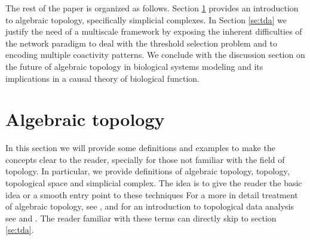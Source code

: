 \documentclass[onecollarge,runningheads]{svjour2}
\begin{document}
The rest of the paper is organized as follows. Section \ref{se:at} provides an introduction to algebraic topology, specifically simplicial complexes. 
In Section \ref{se:tda} we justify the need of a multiscale framework by exposing the inherent difficulties of the network paradigm to deal with the threshold selection problem and to encoding multiple coactivity patterns.
We conclude with the discussion section on the future of algebraic topology in biological systems modeling and its implications in a causal theory of biological function.


\section{Algebraic topology}  %
\label{se:at}

In this section we will provide some definitions and examples to make the concepts clear to the reader, specially for those not familiar with the field of topology. In particular, we provide definitions of algebraic topology, topology, topological space and simplicial complex. The idea is to give the reader the basic idea or a smooth entry point to these techniques For a more in detail treatment of algebraic topology, see \cite{munkres1984elements}, \cite{hatcher2001} and for an introduction to topological data analysis see \cite{carlsson2009topology} and \cite{wasserman2016topological}. The reader familiar with these terms can directly skip to section \ref{se:tda}. 
\end{document}
